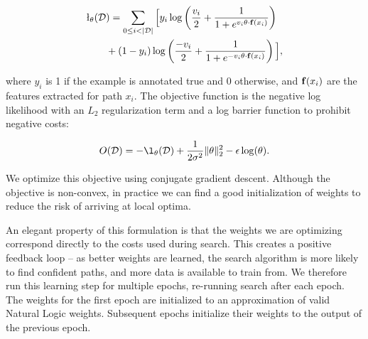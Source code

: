 \begin{align*}
\l_\theta(\sD&) = \sum_{0 \leq i < |\sD|} \Big[
    y_i \log \left(\frac{v_i}{2} + \frac{1}{1 + e^{v_i \theta \cdot \bef(x_i)}} \right) \\
    &+ (1 - y_i) \log \left(\frac{-v_i}{2} + \frac{1}{1 + e^{-v_i \theta \cdot \bef(x_i)}} \right)
  \Big],
\end{align*}

\noindent where $y_i$ is 1 if the example is annotated true and 0
  otherwise, and $\mathbf{f}(x_i)$ are the features extracted for path $x_i$.
The objective function is the negative log likelihood with
  an $L_2$ regularization term and a log barrier function to 
  prohibit negative costs:

\begin{equation*}
O(\sD) = -\l_\theta(\sD) 
  + \frac{1}{2 \sigma^2}\|\theta\|_2^2
  - \epsilon \log(\theta).
\end{equation*}

We optimize this objective using conjugate gradient descent.
Although the objective is non-convex, in practice we can find a good
  initialization of weights to reduce the risk of arriving at
  local optima.

An elegant property of this formulation is that the weights we are
  optimizing correspond directly to the costs used during search.
This creates a positive feedback loop -- as better weights are learned,
  the search algorithm is more likely to find confident paths, and
  more data is available to train from.
We therefore run this learning step for multiple epochs,
  re-running search after each epoch.
The weights for the first epoch are initialized to an approximation
  of valid Natural Logic weights.
Subsequent epochs initialize their weights to the output of the previous
  epoch.






